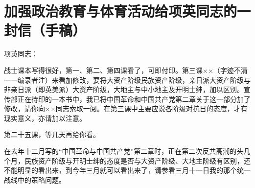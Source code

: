 \section[加强政治教育与体育活动给项英同志的一封信（手稿）（一九三八年）]{加强政治教育与体育活动给项英同志的一封信（手稿）}


项英同志：

战士课本写得很好，第一、第二、第四课看了，可即付印。第三课××（字迹不清一一编录者注）来看加修改，要将大资产阶级民族资产阶级，亲日派大资产阶级与非亲日派（即英美派）大资产阶级，大地主与中小地主及开明士绅，加以区别。宣传部正在待印的一本书中，我已将中国革命和中国共产党第二章关于这一部分加了修改，请你向××同志索取一阅。在第三课中主要应说各阶级对抗日的态度，才有现实意义，亦请加以注意。

第二十五课，等几天再给你看。

在去年十二月写的“中国革命与中国共产党”第二章时，正在第二次反共高潮的头几个月，民族资产阶级与开明士绅的态度是否与大资产阶级、大地主阶级有区别，还不能明显的看出来，到今年三月就可以看出来了，请参看三月十一日我的那个统一战线中的策略问题。

